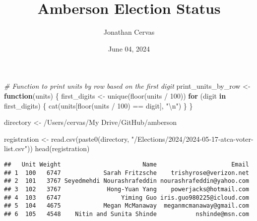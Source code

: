 \documentclass[
  11pt,
]{article}
\title{Amberson Election Status}
\author{Jonathan Cervas}
\date{June 04, 2024}
\newenvironment{Shaded}{\begin{snugshade}}{\end{snugshade}}
\newcommand{\CommentTok}[1]{\textcolor[rgb]{0.56,0.35,0.01}{\textit{#1}}}
\newcommand{\ControlFlowTok}[1]{\textcolor[rgb]{0.13,0.29,0.53}{\textbf{#1}}}
\newcommand{\DecValTok}[1]{\textcolor[rgb]{0.00,0.00,0.81}{#1}}
\newcommand{\FunctionTok}[1]{\textcolor[rgb]{0.00,0.00,0.00}{#1}}
\newcommand{\NormalTok}[1]{#1}
\newcommand{\OtherTok}[1]{\textcolor[rgb]{0.56,0.35,0.01}{#1}}
\newcommand{\SpecialCharTok}[1]{\textcolor[rgb]{0.00,0.00,0.00}{#1}}
\newcommand{\StringTok}[1]{\textcolor[rgb]{0.31,0.60,0.02}{#1}}
\begin{document}
\maketitle

\begin{Shaded}
\begin{Highlighting}[]
\CommentTok{\# Function to print units by row based on the first digit}
\NormalTok{print\_units\_by\_row }\OtherTok{\textless{}{-}} \ControlFlowTok{function}\NormalTok{(units) \{}
\NormalTok{  first\_digits }\OtherTok{\textless{}{-}} \FunctionTok{unique}\NormalTok{(}\FunctionTok{floor}\NormalTok{(units }\SpecialCharTok{/} \DecValTok{100}\NormalTok{))}
  \ControlFlowTok{for}\NormalTok{ (digit }\ControlFlowTok{in}\NormalTok{ first\_digits) \{}
    \FunctionTok{cat}\NormalTok{(units[}\FunctionTok{floor}\NormalTok{(units }\SpecialCharTok{/} \DecValTok{100}\NormalTok{) }\SpecialCharTok{==}\NormalTok{ digit], }\StringTok{"}\SpecialCharTok{\textbackslash{}n}\StringTok{"}\NormalTok{)}
\NormalTok{  \}}
\NormalTok{\}}
\end{Highlighting}
\end{Shaded}

\begin{Shaded}
\begin{Highlighting}[]
\NormalTok{directory }\OtherTok{\textless{}{-}} \StringTok{\textquotesingle{}/Users/cervas/My Drive/GitHub/amberson\textquotesingle{}}
\end{Highlighting}
\end{Shaded}

\begin{Shaded}
\begin{Highlighting}[]
\NormalTok{registration }\OtherTok{\textless{}{-}} \FunctionTok{read.csv}\NormalTok{(}\FunctionTok{paste0}\NormalTok{(directory, }\StringTok{"/Elections/2024/2024{-}05{-}17{-}atca{-}voter{-}list.csv"}\NormalTok{))}
\FunctionTok{head}\NormalTok{(registration)}
\end{Highlighting}
\end{Shaded}

\begin{verbatim}
##   Unit Weight                       Name                     Email
## 1  100   6747            Sarah Fritzsche    trishyrose@verizon.net
## 2  101   3767 Seyedmehdi Nourashrafeddin nourashrafeddin@yahoo.com
## 3  102   3767             Hong-Yuan Yang    powerjacks@hotmail.com
## 4  103   6747                 Yiming Guo iris.guo980225@icloud.com
## 5  104   4675            Megan McManaway  meganmcmanaway@gmail.com
## 6  105   4548    Nitin and Sunita Shinde           nshinde@msn.com
\end{verbatim}
\end{document}
